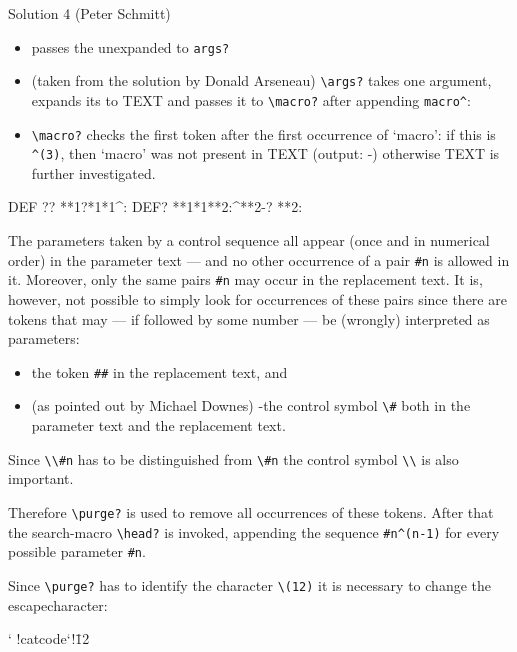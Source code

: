 \begin{solution}{Solution 4 (Peter Schmitt)}
\begin{itemize}
\item \cmd{\args} passes the  unexpanded to \verb|args?|
\item (taken from the solution by Donald Arseneau)
 \verb|\args?| takes one argument, expands its \cmd{\meaning} to TEXT
       and passes it to \verb|\macro?| after appending \verb|macro^|:
\item \verb|\macro?| checks the first token after the first occurrence of 
`macro':
       if this is \verb?^(3)?, then `macro' was not present in TEXT (output: -)
       otherwise TEXT is further investigated.
\end{itemize}

\begin{lcode}
\def\args{\expandafter\args?\noexpand}
\?DEF \args? {**1{\expandafter\macro?\meaning **1*1^:}}
   \?DEF\macro? {**1*1**2:{\ifx^**2-\else\expandafter\purge? **2:\fi}}
\end{lcode}

 The parameters taken by a control sequence all appear (once and in 
 numerical order) in the parameter text --- and no other occurrence 
 of a pair \verb?#n? is allowed in it. Moreover, only the same pairs \verb?#n? 
may 
 occur in the replacement text. It is, however, not possible to simply 
 look for occurrences of these pairs since there are tokens that may ---
 if followed by some number --- be (wrongly) interpreted as parameters:
\begin{itemize}
\item the token \verb?##? in the replacement text, and
\item (as pointed out by Michael Downes)
   -the control symbol \verb?\#? both in the parameter text and the 
 replacement text.
\end{itemize}
 Since \verb?\\#n? has to be distinguished from \verb?\#n? the control 
symbol \verb?\\? is also important.

 Therefore \verb|\purge?| is used to remove all occurrences of these tokens.
 After that the search-macro \verb|\head?| is invoked, appending
   the sequence \verb?#n^(n-1)? for every possible parameter \verb?#n?.

 Since \verb|\purge?| has to identify the character \verb?\(12)? it is 
necessary   to change the escapecharacter:

\begin{lcode}
\catcode` !catcode`!\=12   %
\end{lcode}


\end{solution}
